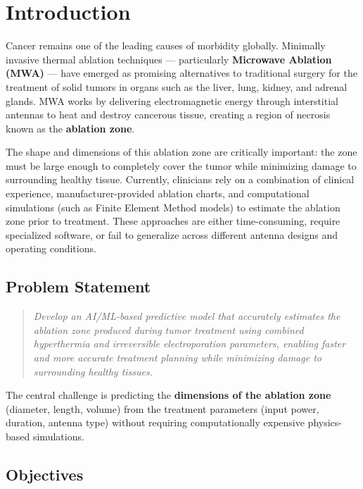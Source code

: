 \chapter{Introduction}

Cancer remains one of the leading causes of morbidity globally. Minimally invasive thermal ablation techniques --- particularly \textbf{Microwave Ablation (MWA)} --- have emerged as promising alternatives to traditional surgery for the treatment of solid tumors in organs such as the liver, lung, kidney, and adrenal glands. MWA works by delivering electromagnetic energy through interstitial antennas to heat and destroy cancerous tissue, creating a region of necrosis known as the \textbf{ablation zone}.

The shape and dimensions of this ablation zone are critically important: the zone must be large enough to completely cover the tumor while minimizing damage to surrounding healthy tissue. Currently, clinicians rely on a combination of clinical experience, manufacturer-provided ablation charts, and computational simulations (such as Finite Element Method models) to estimate the ablation zone prior to treatment. These approaches are either time-consuming, require specialized software, or fail to generalize across different antenna designs and operating conditions.


\section{Problem Statement}

\begin{quote}
\textit{Develop an AI/ML-based predictive model that accurately estimates the ablation zone produced during tumor treatment using combined hyperthermia and irreversible electroporation parameters, enabling faster and more accurate treatment planning while minimizing damage to surrounding healthy tissues.}
\end{quote}

The central challenge is predicting the \textbf{dimensions of the ablation zone} (diameter, length, volume) from the treatment parameters (input power, duration, antenna type) without requiring computationally expensive physics-based simulations.


\section{Objectives}

